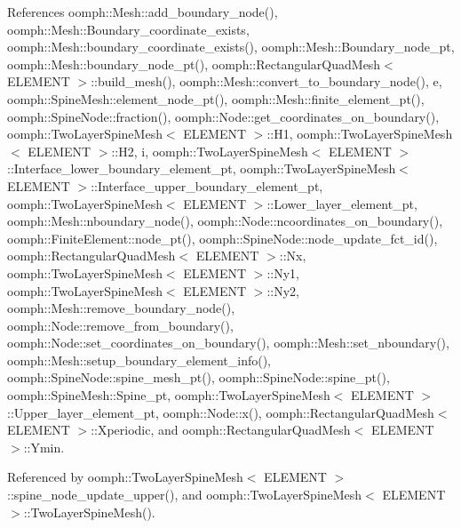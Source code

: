 References oomph\+::\+Mesh\+::add\+\_\+boundary\+\_\+node(), oomph\+::\+Mesh\+::\+Boundary\+\_\+coordinate\+\_\+exists, oomph\+::\+Mesh\+::boundary\+\_\+coordinate\+\_\+exists(), oomph\+::\+Mesh\+::\+Boundary\+\_\+node\+\_\+pt, oomph\+::\+Mesh\+::boundary\+\_\+node\+\_\+pt(), oomph\+::\+Rectangular\+Quad\+Mesh$<$ E\+L\+E\+M\+E\+N\+T $>$\+::build\+\_\+mesh(), oomph\+::\+Mesh\+::convert\+\_\+to\+\_\+boundary\+\_\+node(), e, oomph\+::\+Spine\+Mesh\+::element\+\_\+node\+\_\+pt(), oomph\+::\+Mesh\+::finite\+\_\+element\+\_\+pt(), oomph\+::\+Spine\+Node\+::fraction(), oomph\+::\+Node\+::get\+\_\+coordinates\+\_\+on\+\_\+boundary(), oomph\+::\+Two\+Layer\+Spine\+Mesh$<$ E\+L\+E\+M\+E\+N\+T $>$\+::\+H1, oomph\+::\+Two\+Layer\+Spine\+Mesh$<$ E\+L\+E\+M\+E\+N\+T $>$\+::\+H2, i, oomph\+::\+Two\+Layer\+Spine\+Mesh$<$ E\+L\+E\+M\+E\+N\+T $>$\+::\+Interface\+\_\+lower\+\_\+boundary\+\_\+element\+\_\+pt, oomph\+::\+Two\+Layer\+Spine\+Mesh$<$ E\+L\+E\+M\+E\+N\+T $>$\+::\+Interface\+\_\+upper\+\_\+boundary\+\_\+element\+\_\+pt, oomph\+::\+Two\+Layer\+Spine\+Mesh$<$ E\+L\+E\+M\+E\+N\+T $>$\+::\+Lower\+\_\+layer\+\_\+element\+\_\+pt, oomph\+::\+Mesh\+::nboundary\+\_\+node(), oomph\+::\+Node\+::ncoordinates\+\_\+on\+\_\+boundary(), oomph\+::\+Finite\+Element\+::node\+\_\+pt(), oomph\+::\+Spine\+Node\+::node\+\_\+update\+\_\+fct\+\_\+id(), oomph\+::\+Rectangular\+Quad\+Mesh$<$ E\+L\+E\+M\+E\+N\+T $>$\+::\+Nx, oomph\+::\+Two\+Layer\+Spine\+Mesh$<$ E\+L\+E\+M\+E\+N\+T $>$\+::\+Ny1, oomph\+::\+Two\+Layer\+Spine\+Mesh$<$ E\+L\+E\+M\+E\+N\+T $>$\+::\+Ny2, oomph\+::\+Mesh\+::remove\+\_\+boundary\+\_\+node(), oomph\+::\+Node\+::remove\+\_\+from\+\_\+boundary(), oomph\+::\+Node\+::set\+\_\+coordinates\+\_\+on\+\_\+boundary(), oomph\+::\+Mesh\+::set\+\_\+nboundary(), oomph\+::\+Mesh\+::setup\+\_\+boundary\+\_\+element\+\_\+info(), oomph\+::\+Spine\+Node\+::spine\+\_\+mesh\+\_\+pt(), oomph\+::\+Spine\+Node\+::spine\+\_\+pt(), oomph\+::\+Spine\+Mesh\+::\+Spine\+\_\+pt, oomph\+::\+Two\+Layer\+Spine\+Mesh$<$ E\+L\+E\+M\+E\+N\+T $>$\+::\+Upper\+\_\+layer\+\_\+element\+\_\+pt, oomph\+::\+Node\+::x(), oomph\+::\+Rectangular\+Quad\+Mesh$<$ E\+L\+E\+M\+E\+N\+T $>$\+::\+Xperiodic, and oomph\+::\+Rectangular\+Quad\+Mesh$<$ E\+L\+E\+M\+E\+N\+T $>$\+::\+Ymin.



Referenced by oomph\+::\+Two\+Layer\+Spine\+Mesh$<$ E\+L\+E\+M\+E\+N\+T $>$\+::spine\+\_\+node\+\_\+update\+\_\+upper(), and oomph\+::\+Two\+Layer\+Spine\+Mesh$<$ E\+L\+E\+M\+E\+N\+T $>$\+::\+Two\+Layer\+Spine\+Mesh().

